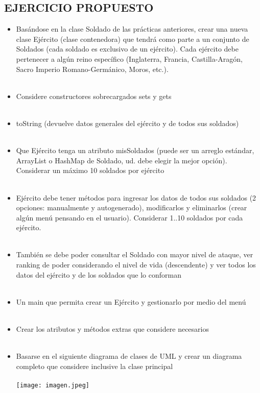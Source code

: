 \documentclass{article}
\begin{document}
\begin{itemize}
    \section{EJERCICIO PROPUESTO}
	\begin{itemize}
        \textcolor{red}{PROBLEMA 01}
        \\
        \\
        \item {Basándose en la clase Soldado de las prácticas anteriores, crear una nueva clase Ejército (clase contenedora) que tendrá como parte a un conjunto de Soldados (cada soldado es exclusivo de un ejército). Cada ejército debe pertenecer a algún reino específico (Inglaterra, Francia, Castilla-Aragón, Sacro Imperio Romano-Germánico, Moros, etc.).}
        \\
        \\
        \item Considere constructores sobrecargados sets y gets
        \\
        \\
        \item toString (devuelve datos generales del ejército y de todos sus soldados)
        \\
        \\
        \item Que Ejército tenga un atributo misSoldados (puede ser un arreglo estándar, ArrayList o HashMap de Soldado, ud. debe elegir la mejor opción). Considerar un máximo 10 soldados por ejército
        \\
        \\
        \item Ejército debe tener métodos para ingresar los datos de todos sus soldados (2 opciones: manualmente y autogenerado), modificarlos y eliminarlos (crear algún menú pensando en el usuario). Considerar 1..10 soldados por cada ejército.
        \\
        \\
        \item También se debe poder consultar el Soldado con mayor nivel de ataque, ver ranking de poder considerando el nivel de vida (descendente) y ver todos los datos del ejército y de los soldados que lo conforman
        \\
        \\
        \item Un main que permita crear un Ejército y gestionarlo por medio del menú
        \\
        \\
        \item Crear los atributos y métodos extras que considere necesarios
        \\
        \\
        \item Basarse en el siguiente diagrama de clases de UML y crear un diagrama completo que considere inclusive la clase principal
        \\
        \\
        \texttt{[image: imagen.jpeg]}
        \\
      

\end{itemize}
\end{itemize}
\end{document}
